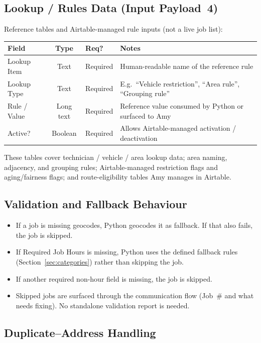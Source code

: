 \documentclass[12pt]{article}
\begin{document}
\subsection*{Lookup / Rules Data (Input Payload~4)}

Reference tables and Airtable-managed rule inputs (not a live job list):

\medskip
{\small
\begin{longtable}{lclp{4.5cm}}
\toprule
\textbf{Field} & \textbf{Type} & \textbf{Req?} & \textbf{Notes} \\
\midrule
Lookup Item      & Text      & Required & Human-readable name of the reference rule \\
Lookup Type      & Text      & Required & E.g.\ ``Vehicle restriction'', ``Area rule'', ``Grouping rule'' \\
Rule / Value     & Long text & Required & Reference value consumed by Python or surfaced to Amy \\
Active?          & Boolean   & Required & Allows Airtable-managed activation / deactivation \\
\bottomrule
\end{longtable}
}

These tables cover technician / vehicle / area lookup data; area naming, adjacency, and grouping rules; Airtable-managed restriction flags and aging/fairness flags; and route-eligibility tables Amy manages in Airtable.

\subsection*{Validation and Fallback Behaviour}
\begin{itemize}
    \item If a job is missing geocodes, Python geocodes it as fallback.  If that also fails, the job is skipped.
    \item If Required Job Hours is missing, Python uses the defined fallback rules (Section~\ref{sec:categories}) rather than skipping the job.
    \item If another required non-hour field is missing, the job is skipped.
    \item Skipped jobs are surfaced through the communication flow (Job~\# and what needs fixing). No standalone validation report is needed.
\end{itemize}

\subsection*{Duplicate--Address Handling}
\label{sec:duplicates}
\end{document}
